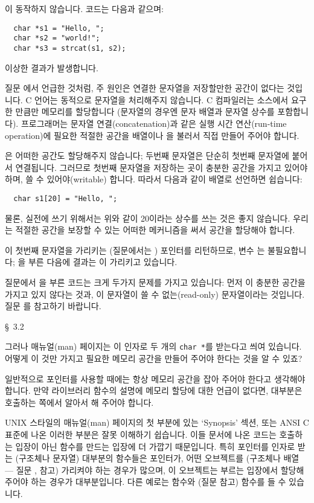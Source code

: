 \begin{faq}
	이 동작하지 않습니다.  코드는 다음과 같으며:
\begin{verbatim}
  char *s1 = "Hello, ";
  char *s2 = "world!";
  char *s3 = strcat(s1, s2);
\end{verbatim}
	\noindent 이상한 결과가 발생합니다.

\A
	질문 에서 언급한 것처럼, 주 원인은 연결한 문자열을 저장할만한
	공간이 없다는 것입니다.  C 언어는 동적으로 문자열을 처리해주지 
	않습니다.
	C 컴파일러는 소스에서 요구한 만큼만 메모리를 할당합니다 (문자열의
	경우엔 문자 배열과 문자열 상수를 포함합니다).  프로그래머는
	문자열 연결(concatenation)과 같은 실행 시간 연산(run-time operation)에
	필요한 적절한 공간을 배열이나 을 불러서 직접 만들어
	주어야 합니다.

	은 어떠한 공간도 할당해주지 않습니다;  두번째 문자열은
	단순히 첫번째 문자열에 붙어서 연결됩니다.  그러므로 첫번째 문자열을
	저장하는 곳이 충분한 공간을 가지고 있어야 하며, 쓸 수 있어야(writable)
	합니다. 따라서 다음과 같이 배열로 선언하면 쉽습니다:

\begin{verbatim}
  char s1[20] = "Hello, ";
\end{verbatim}

	물론, 실전에 쓰기 위해서는 위와 같이 20이라는 상수를 쓰는 것은
	좋지 않습니다. 우리는 적절한 공간을 보장할 수 있는 어떠한 메커니즘을
	써서 공간을 할당해야 합니다.

	\noindent {}이 첫번째 문자열을 가리키는 (질문에서는
	) 포인터를 리턴하므로, 변수 는 불필요합니다;
	을 부른 다음에 결과는 이 가리키고 있습니다.

	질문에서 을 부른 코드는 크게 두가지 문제를 가지고
	있습니다:
	먼저 이 충분한 공간을 가지고 있지 않다는 것과, 이 문자열이
	쓸 수 없는(read-only) 문자열이라는 것입니다.  질문 를 참고하기
	바랍니다.

\R
	\cite{ctp} \S\ 3.2 
\end{faq}

\begin{faq}
	그러나 매뉴얼(man) 페이지는 이 인자로 두 개의
	\verb+char *+를 받는다고 씌여 있습니다.  어떻게 이 것만 가지고
	필요한 메모리 공간을 만들어 주어야 한다는 것을 알 수 있죠?

\A
	일반적으로 포인터를 사용할 때에는 항상 메모리 공간을 잡아 주어야
	한다고 생각해야 합니다.  만약 라이브러리 함수의 설명에 메모리 할당에
	대한 언급이 없다면, 대부분은 호출하는 쪽에서 알아서 해 주어야 합니다.

	UNIX 스타일의 매뉴얼(man) 페이지의 첫 부분에 있는 `Synopsis' 섹션,
	또는 ANSI C 표준에 나온 이러한 부분은 잘못 이해하기 쉽습니다.
	이들 문서에 나온 코드는 호출하는 입장이 아닌 함수를 만드는 입장에
	더 가깝기 때문입니다.  특히 포인터를 인자로 받는 (구조체나 문자열)
	대부분의 함수들은 포인터가, 어떤 오브젝트를 (구조체나 배열 --- 질문
	,  참고) 가리켜야 하는 경우가 많으며, 이 오브젝트는 부르는
	입장에서 할당해 주어야 하는 경우가 대부분입니다.  다른 예로는
	 함수와 (질문  참고)  함수를 들 수 있습니다.
\end{faq}

